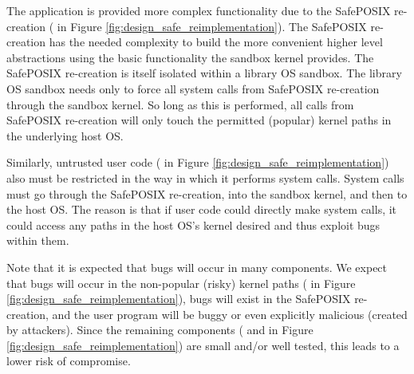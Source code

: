 The application is provided more complex functionality due to the SafePOSIX re-creation 
( in Figure \ref{fig:design_safe_reimplementation}). 
The SafePOSIX re-creation has the needed complexity to build the more convenient higher level 
abstractions using the basic functionality the sandbox kernel provides. 
The SafePOSIX re-creation is itself isolated within a library OS sandbox. 
The library OS sandbox needs only to force all system calls from SafePOSIX re-creation through the sandbox kernel. 
So long as this is performed, all calls from SafePOSIX re-creation will only touch the permitted (popular) kernel paths in the underlying host OS.

Similarly, untrusted user code ( in Figure \ref{fig:design_safe_reimplementation}) also must be restricted in the way 
in which it performs system calls. 
System calls must go through the SafePOSIX re-creation, into the sandbox kernel, and then to the host OS. 
The reason is that if user code could directly make system calls, it could access any paths in the host OS's kernel desired 
and thus exploit bugs within them.

Note that it is expected that bugs will occur in many components. 
We expect that bugs will occur in the non-popular (risky) kernel paths ( in Figure \ref{fig:design_safe_reimplementation}), 
bugs will exist in the SafePOSIX re-creation, and the user program will be buggy or even explicitly malicious (created by attackers). 
Since the remaining components ( and  in Figure \ref{fig:design_safe_reimplementation}) 
are small and/or well tested, this leads to a lower risk of compromise. 
